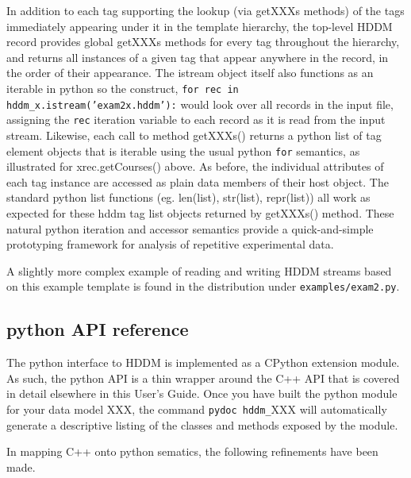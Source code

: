 \documentclass{revtex4}
\begin{document}
In addition to each tag supporting the lookup (via getXXXs methods) of the
tags immediately appearing under it in the template hierarchy, the 
top-{}level HDDM record provides global getXXXs methods for every tag
throughout the hierarchy, and returns all instances of a given tag that
appear anywhere in the record, in the order of their appearance. The
istream object itself also functions as an iterable in python so the
construct, \texttt{for rec in hddm\_x.istream('exam2x.hddm'):} would
look over all records in the input file, assigning the \texttt{rec}
iteration variable to each record as it is read from the input stream.
Likewise, each call to method getXXXs() returns a python list of tag
element objects that is iterable using the usual python \texttt{for}
semantics, as illustrated for xrec.getCourses() above. As before, the
individual attributes of each tag instance are accessed as plain data 
members of their host object. The standard python list functions (eg.
len(list), str(list), repr(list)) all work as expected for these hddm
tag list objects returned by getXXXs() method. These natural python
iteration and accessor semantics provide a quick-{}and-{}simple
prototyping framework for analysis of repetitive experimental data.

A slightly more complex example of reading and writing HDDM streams
based on this example template is found in the distribution under
\texttt{examples/exam2.py}.

\subsection{python API reference}

The python interface to HDDM is implemented as a CPython extension module.
As such, the python API is a thin wrapper around the C++ API that is
covered in detail elsewhere in this User's Guide. Once you have built
the python module for your data model XXX, the command
\texttt{pydoc hddm\_}XXX will automatically generate a descriptive
listing of the classes and methods exposed by the module.

In mapping C++ onto python sematics, the following refinements have been
made.
\end{document}
